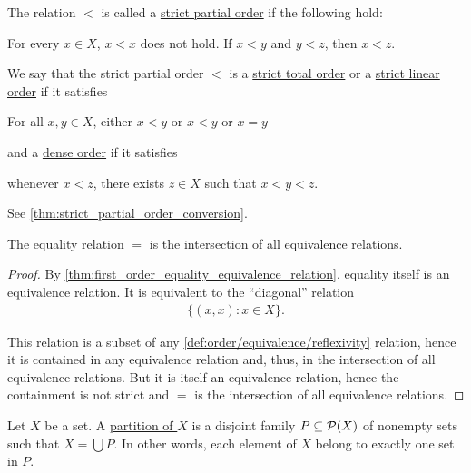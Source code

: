 \begin{definition}
\begin{defenum}
    \item\label{def:order/strict_partial}\cite[168]{Enderton1977} The relation $<$ is called a \ul{strict partial order} if the following hold:
    \begin{description}
       For every $x \in X$, $x < x$ does not hold.
       If $x < y$ and $y < z$, then $x < z$.
    \end{description}

    We say that the strict partial order $<$ is a \ul{strict total order} or a \ul{strict linear order} if it satisfies
    \begin{description}
       For all $x, y \in X$, either $x < y$ or $x < y$ or $x = y$
    \end{description}
    and a \ul{dense order} if it satisfies
    \begin{description}
       whenever $x < z$, there exists $z \in X$ such that $x < y < z$.
    \end{description}

    See \cref{thm:strict_partial_order_conversion}.
  \end{defenum}
\end{definition}

\begin{proposition}\label{thm:equality_is_smallest_equivalence_relation}
  The equality relation $=$ is the intersection of all equivalence relations.
\end{proposition}
\begin{proof}
  By \cref{thm:first_order_equality_equivalence_relation}, equality itself is an equivalence relation. It is equivalent to the \enquote{diagonal} relation
  \begin{align*}
    \{ (x, x) \colon x \in X \}.
  \end{align*}

  This relation is a subset of any \ref{def:order/equivalence/reflexivity} relation, hence it is contained in any equivalence relation and, thus, in the intersection of all equivalence relations. But it is itself an equivalence relation, hence the containment is not strict and $=$ is the intersection of all equivalence relations.
\end{proof}

\begin{definition}\label{def:set_partition}
  Let $X$ be a set. A \ul{partition of $X$} is a disjoint family $P \subseteq \operatorname{\mathcal P}(X)$ of nonempty sets such that $X = \bigcup P$. In other words, each element of $X$ belong to exactly one set in $P$.
\end{definition}


